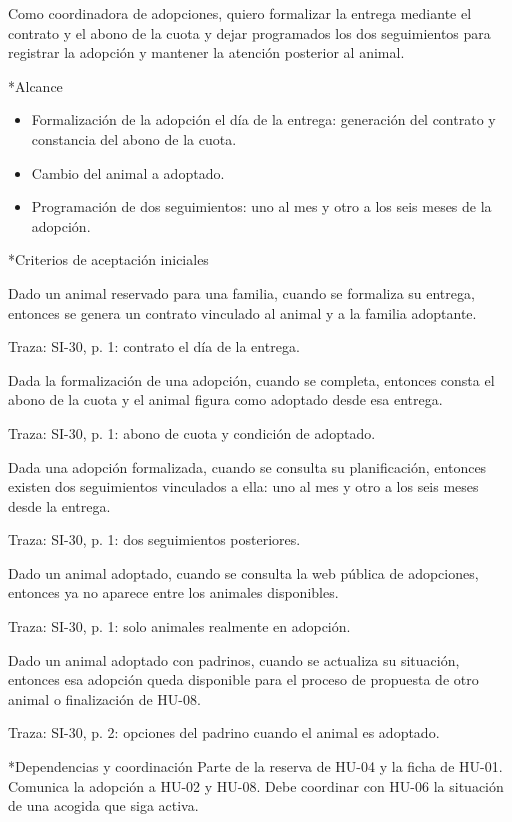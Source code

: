 \documentclass[10pt,a4paper]{article}
\makeatletter
\newcommand{\apartado}{\@startsection{subsection}{2}{\z@}{7pt}{3pt}{\normalfont\normalsize\bfseries\color{verde}}*}
\newenvironment{criterios}{\begin{description}[style=nextline,leftmargin=0pt,labelsep=0pt,font=\bfseries\color{verde},itemsep=5pt,topsep=3pt,parsep=0pt]}{\end{description}}
\newcommand{\historia}[1]{\begingroup\setlength{\fboxsep}{10pt}\colorbox{suave}{\parbox{\dimexpr\linewidth-20pt\relax}{#1}}\endgroup}
\newcommand{\traza}[1]{{\footnotesize\color{gris}Traza: SI-30, #1.}}
\newcommand{\HU}[1]{\mbox{HU-#1}}
\makeatother
\begin{document}
\historia{Como coordinadora de adopciones, quiero formalizar la entrega mediante el contrato y el abono de la cuota y dejar programados los dos seguimientos para registrar la adopción y mantener la atención posterior al animal.}
\apartado{Alcance}
\begin{itemize}
\item Formalización de la adopción el día de la entrega: generación del contrato y constancia del abono de la cuota.
\item Cambio del animal a adoptado.
\item Programación de dos seguimientos: uno al mes y otro a los seis meses de la adopción.
\end{itemize}
\apartado{Criterios de aceptación iniciales}
\begin{criterios}
\item[CA-05-01] Dado un animal reservado para una familia, cuando se formaliza su entrega, entonces se genera un contrato vinculado al animal y a la familia adoptante.\par\traza{p. 1: contrato el día de la entrega}
\item[CA-05-02] Dada la formalización de una adopción, cuando se completa, entonces consta el abono de la cuota y el animal figura como adoptado desde esa entrega.\par\traza{p. 1: abono de cuota y condición de adoptado}
\item[CA-05-03] Dada una adopción formalizada, cuando se consulta su planificación, entonces existen dos seguimientos vinculados a ella: uno al mes y otro a los seis meses desde la entrega.\par\traza{p. 1: dos seguimientos posteriores}
\item[CA-05-04] Dado un animal adoptado, cuando se consulta la web pública de adopciones, entonces ya no aparece entre los animales disponibles.\par\traza{p. 1: solo animales realmente en adopción}
\item[CA-05-05] Dado un animal adoptado con padrinos, cuando se actualiza su situación, entonces esa adopción queda disponible para el proceso de propuesta de otro animal o finalización de \HU{08}.\par\traza{p. 2: opciones del padrino cuando el animal es adoptado}
\end{criterios}
\apartado{Dependencias y coordinación}
Parte de la reserva de \HU{04} y la ficha de \HU{01}. Comunica la adopción a \HU{02} y \HU{08}. Debe coordinar con \HU{06} la situación de una acogida que siga activa.
\end{document}
